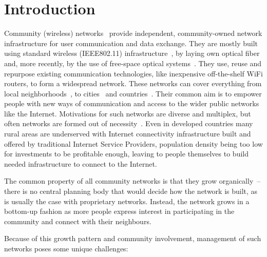 \documentclass[5p,sort&compress]{elsarticle}
\begin{document}
\section{Introduction}

Community (wireless) networks~\cite{Bruno_2005,Frangoudis_2011} provide independent, community-owned network infrastructure for user communication and data exchange.
They are mostly built using standard wireless (IEEE802.11) infrastructure~\cite{Akyildiz_2005}, by laying own optical fiber and, more recently, by the use of free-space optical systems~\cite{Mustafa_2013}.
They use, reuse and repurpose existing communication technologies, like inexpensive off-the-shelf WiFi routers, to form a widespread network.
These networks can cover everything from local neighborhoods~\cite{RedHook_2013}, to cities~\cite{AWMN} and countries~\cite{wlanslovenija_2009, guifi_2003, Funkfeuer_2003, Freifunk_2003}.
Their common aim is to empower people with new ways of communication and access to the wider public networks like the Internet.
Motivations for such networks are diverse and multiplex, but often networks are formed out of necessity~\cite{WNDW_2013}.
Even in developed countries many rural areas are underserved with Internet connectivity infrastructure built and offered by traditional Internet Service Providers, population density being too low for investments to be profitable enough, leaving to people themselves to build needed infrastructure to connect to the Internet.

The common property of all community networks is that they grow organically~-- there is no central planning body that would decide how the network is built, as is usually the case with proprietary networks.
Instead, the network grows in a bottom-up fashion as more people express interest in participating in the community and connect with their neighbours.

Because of this growth pattern and community involvement, management of such networks poses some unique challenges:
\end{document}
